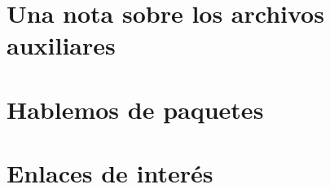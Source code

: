 \documentclass[a4paper,10pt]{book}
\begin{document}
%

\appendix
\chapter{Una nota sobre los archivos auxiliares}


\chapter{Hablemos de paquetes}


\chapter{Enlaces de interés}



\backmatter
% 
%
\end{document}
